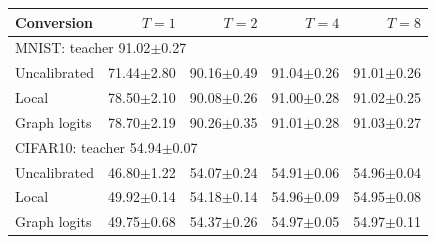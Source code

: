 \begin{tabular}{lrrrr}
\toprule
Conversion & $T=1$ & $T=2$ & $T=4$ & $T=8$ \\
\midrule
\multicolumn{5}{l}{MNIST: teacher 91.02$\pm$0.27} \\
Uncalibrated & 71.44$\pm$2.80 & 90.16$\pm$0.49 & 91.04$\pm$0.26 & 91.01$\pm$0.26 \\
Local & 78.50$\pm$2.10 & 90.08$\pm$0.26 & 91.00$\pm$0.28 & 91.02$\pm$0.25 \\
Graph logits & 78.70$\pm$2.19 & 90.26$\pm$0.35 & 91.01$\pm$0.28 & 91.03$\pm$0.27 \\
\midrule
\multicolumn{5}{l}{CIFAR10: teacher 54.94$\pm$0.07} \\
Uncalibrated & 46.80$\pm$1.22 & 54.07$\pm$0.24 & 54.91$\pm$0.06 & 54.96$\pm$0.04 \\
Local & 49.92$\pm$0.14 & 54.18$\pm$0.14 & 54.96$\pm$0.09 & 54.95$\pm$0.08 \\
Graph logits & 49.75$\pm$0.68 & 54.37$\pm$0.26 & 54.97$\pm$0.05 & 54.97$\pm$0.11 \\
\bottomrule
\end{tabular}
